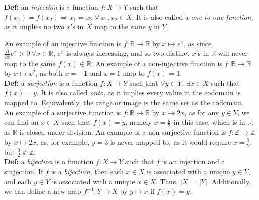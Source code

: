 \documentclass[12pt]{article}
\begin{document}
\textbf{Def: }an \emph{injection} is a function $f: X \rightarrow Y$ such that $f(x_1) = f(x_2)\Rightarrow x_1 = x_2\ \forall\ x_1, x_2 \in X$. It is also called a \emph{one to one function}, as it implies no two $x$'s in $X$ map to the same $y$ in $Y$. 

An example of an injective function is $f: \mathbb{R} \rightarrow \mathbb{R}$ by $x \mapsto e^{x}$, as since $\frac{\partial}{\partial x}e^x  > 0\ \forall x \in \mathbb{R}$, $e^x$ is always increasing, and so two distinct $x$'s in $\mathbb{R}$ will never map to the same $f(x) \in \mathbb{R}$. An example of a non-injective function is $f: \mathbb{R} \rightarrow \mathbb{R}$ by $x \mapsto x^2$, as both $x = -1$ and $x = 1$ map to $f(x) = 1$. \\

\textbf{Def: }a \emph{surjection} is a function $f: X \rightarrow Y$ such that $\forall y \in Y,\ \exists x \in X$ such that $f(x) = y$. It is also called \emph{onto}, as it implies every value in the codomain is mapped to. Equivalently, the range or image is the same set as the codomain.\\

An example of a surjective function is $f: \mathbb{R} \rightarrow \mathbb{R}$ by $x \mapsto 2x$, as for any $y \in Y$, we can find an $x \in X$ such that $f(x) = y$, namely $x = \frac{y}{2}$ in this case, which is in $\mathbb{R}$, as $\mathbb{R}$ is closed under division. An example of a non-surjective function is $f: \mathbb{Z} \rightarrow \mathbb{Z}$ by $x \mapsto 2x$, as, for example, $y = 3$ is never mapped to, as it would require $x = \frac{3}{2}$, but $\frac{3}{2} \notin \mathbb{Z}$.\\

\textbf{Def: }a \emph{bijection} is a function $f: X \rightarrow Y$ such that $f$ is an injection and a surjection. If $f$ is a \emph{bijection}, then each $x \in X$ is associated with a unique $y \in Y$, and each $y \in Y$ is associated with a unique $x \in X$. Thus, $|X| = |Y|$. Additionally, we can define a new map $f^{-1}: Y \rightarrow X$ by $y \mapsto x$ if $f(x) = y$.\\
\end{document}
